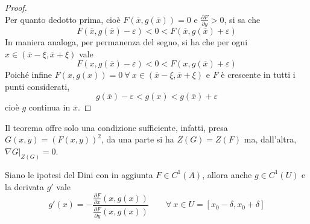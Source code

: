 \begin{proof}
\begin{equation}
       \end{equation}
       Per quanto dedotto prima, cioè $F(\overline{x}, g(\overline{x}))=0$ e $\frac{\partial{F}}{\partial{y}}>0$, si sa che 
       \begin{equation}
           F(\overline{x}, g(\overline{x})-\varepsilon)<0<F(\overline{x}, g(\overline{x})+\varepsilon)
       \end{equation}
       In maniera analoga, per permanenza del segno, si ha che per ogni $x \in (\overline{x}-\xi, \overline{x}+\xi)$ vale
       \begin{equation}
           F(x, g(\overline{x})-\varepsilon)<0<F(x, g(\overline{x})+\varepsilon)
       \end{equation}
       Poiché infine $F(x, g(x))=0\ \forall\ x \in (\overline{x}-\xi, \overline{x}+\xi)$ e $F$ è crescente in tutti i punti considerati,
       \begin{equation}
           g(\overline{x})- \varepsilon < g(x) < g(\overline{x})+\varepsilon
       \end{equation}
       cioè $g$ continua in $\overline{x}$.
       \end{proof}
\begin{oss}
    Il teorema offre solo una condizione sufficiente, infatti, presa $G(x,y)=(F(x,y))^2$, da una parte si ha $Z(G)=Z(F)$ ma, dall'altra, $\nabla G \big|_{Z(G)}=0$.
\end{oss}
\begin{theorem}
Siano le ipotesi del Dini con in aggiunta $F \in C^1(A)$, allora anche $g \in C^1(U)$ e la derivata $g'$ vale
\begin{equation}
    g'(x)=-\frac{\frac{\partial{F}}{\partial{x}}(x, g(x))}{\frac{\partial{F}}{\partial{y}}(x, g(x))} \qquad \forall\ x \in U=[x_0-\delta, x_0+\delta]
\end{equation}
\end{theorem}
